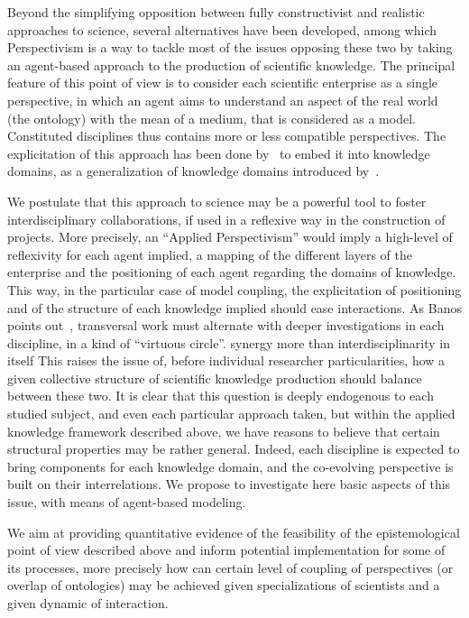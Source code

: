 \documentclass[utf8]{frontiersFPHY} %
\begin{document}
Beyond the simplifying opposition between fully constructivist and realistic approaches to science, several alternatives have been developed, among which Perspectivism \cite{giere2010scientific} is a way to tackle most of the issues opposing these two by taking an agent-based approach to the production of scientific knowledge. The principal feature of this point of view is to consider each scientific enterprise as a single perspective, in which an agent aims to understand an aspect of the real world (the ontology) with the mean of a medium, that is considered as a model. Constituted disciplines thus contains more or less compatible perspectives. The explicitation of this approach has been done by~\cite{raimbault2017knowledge} to embed it into knowledge domains, as a generalization of knowledge domains introduced by~\cite{livet2010ontology}.


We postulate that this approach to science may be a powerful tool to foster interdisciplinary collaborations, if used in a reflexive way in the construction of projects. More precisely, an ``Applied Perspectivism'' would imply a high-level of reflexivity for each agent implied, a mapping of the different layers of the enterprise and the positioning of each agent regarding the domains of knowledge. This way, in the particular case of model coupling, the explicitation of positioning and of the structure of each knowledge implied should ease interactions. As Banos points out~\cite{banos2013pour}, transversal work must alternate with deeper investigations in each discipline, in a kind of ``virtuous circle''. \cite{banos2017knowledge}
synergy more than interdisciplinarity in itself \cite{leydesdorff2020measurement}
This raises the issue of, before individual researcher particularities, how a given collective structure of scientific knowledge production should balance between these two. It is clear that this question is deeply endogenous to each studied subject, and even each particular approach taken, but within the applied knowledge framework described above, we have reasons to believe that certain structural properties may be rather general. Indeed, each discipline is expected to bring components for each knowledge domain, and the co-evolving perspective is built on their interrelations. We propose to investigate here basic aspects of this issue, with means of agent-based modeling.


We aim at providing quantitative evidence of the feasibility of the epistemological point of view described above and inform potential implementation for some of its processes, more precisely how can certain level of coupling of perspectives (or overlap of ontologies) may be achieved given specializations of scientists and a given dynamic of interaction.
\end{document}
